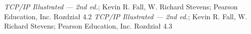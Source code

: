 \begin{thebibliography}{99}
        \emph{TCP/IP Illustrated --- 2nd ed.}; Kevin R. Fall, W. Richard Stevens; Pearson Education, Inc.
        Rozdział 4.2
        \emph{TCP/IP Illustrated --- 2nd ed.}; Kevin R. Fall, W. Richard Stevens; Pearson Education, Inc.
        Rozdział 4.3
\end{thebibliography}
